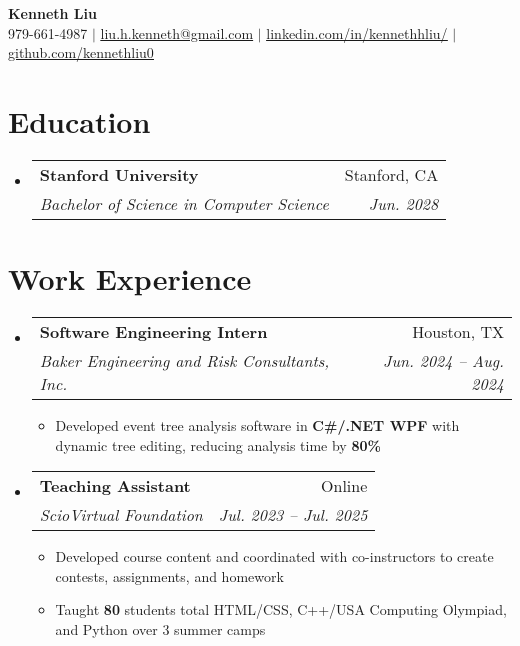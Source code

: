 \documentclass[letterpaper,11pt]{article}
\makeatletter
\newcommand{\resumeItem}[1]{
  \item\small{
    {#1 \vspace{-2pt}}
  }
}
\newcommand{\resumeSubheading}[4]{
  \vspace{-2pt}\item
    \begin{tabular*}{0.97\textwidth}[t]{l@{\extracolsep{\fill}}r}
      \textbf{#1} & #2 \\
      \textit{\small#3} & \textit{\small #4} \\
    \end{tabular*}\vspace{-7pt}
}
\newcommand{\resumeSubHeadingListStart}{\begin{itemize}[leftmargin=0.15in, label={}]}
\newcommand{\resumeSubHeadingListEnd}{\end{itemize}}
\newcommand{\resumeItemListStart}{\begin{itemize}}
\newcommand{\resumeItemListEnd}{\end{itemize}\vspace{-5pt}}
\makeatother
\begin{document}

\begin{center}
    \textbf{\Huge  Kenneth Liu} \\ \vspace{1pt}
    \small 979-661-4987 $|$ \href{mailto:liu.h.kenneth@gmail.com}{\underline{liu.h.kenneth@gmail.com}} $|$ 
    \href{https://www.linkedin.com/in/kennethhliu}{\underline{linkedin.com/in/kennethhliu/}}
    $|$ 
    \href{https://github.com/kennethliu0}{\underline{github.com/kennethliu0}}
\end{center}


\section{Education}
  \resumeSubHeadingListStart
    \resumeSubheading
      {Stanford University}{Stanford, CA}
      {Bachelor of Science in Computer Science}{Jun. 2028}
  \resumeSubHeadingListEnd


\section{Work Experience}
  \resumeSubHeadingListStart
     \resumeSubheading
      {Software Engineering Intern}{Houston, TX}
      {Baker Engineering and Risk Consultants, Inc.}{Jun. 2024 -- Aug. 2024}
      \resumeItemListStart
        \resumeItem{Developed event tree analysis software in \textbf{C\#/.NET WPF} with dynamic tree editing, reducing analysis time by \textbf{80\%}}
      \resumeItemListEnd
    \resumeSubheading
      {Teaching Assistant}{Online}
      {ScioVirtual Foundation}{Jul. 2023 -- Jul. 2025}
      \resumeItemListStart
        \resumeItem{Developed course content and coordinated with co-instructors to create contests, assignments, and homework}
        \resumeItem{Taught \textbf{80} students total HTML/CSS, C++/USA Computing Olympiad, and Python over 3 summer camps}
      \resumeItemListEnd
  \resumeSubHeadingListEnd
\end{document}
